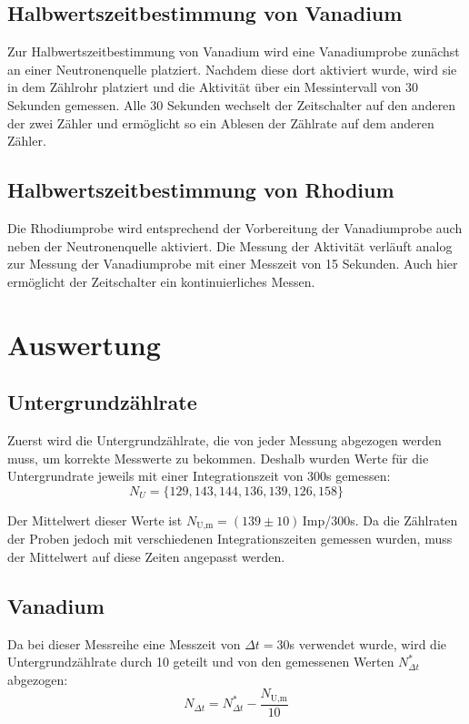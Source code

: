 \documentclass[titlepage = firstcover]{scrartcl}
\begin{document}
        \subsection{Halbwertszeitbestimmung von Vanadium}
            Zur Halbwertszeitbestimmung von Vanadium wird eine Vanadiumprobe zunächst an einer Neutronenquelle platziert. Nachdem diese dort aktiviert wurde, wird sie in dem Zählrohr platziert und 
            die Aktivität über ein Messintervall von 30 Sekunden gemessen. Alle 30 Sekunden wechselt der Zeitschalter auf den anderen der zwei Zähler und ermöglicht so ein Ablesen der Zählrate auf
            dem anderen Zähler.

        \subsection{Halbwertszeitbestimmung von Rhodium}
            Die Rhodiumprobe wird entsprechend der Vorbereitung der Vanadiumprobe auch neben der Neutronenquelle aktiviert. Die Messung der Aktivität verläuft analog zur Messung der Vanadiumprobe
            mit einer Messzeit von 15 Sekunden. Auch hier ermöglicht der Zeitschalter ein kontinuierliches Messen.
            
    \section{Auswertung}
        \subsection{Untergrundzählrate}
            Zuerst wird die Untergrundzählrate, die von jeder Messung abgezogen werden muss, um korrekte Messwerte zu bekommen.
            Deshalb wurden Werte für die Untergrundrate jeweils mit einer Integrationszeit von 300s gemessen:
            \begin{equation*}
                N_U = \{129, 143, 144, 136, 139, 126, 158\}
            \end{equation*}

            Der Mittelwert dieser Werte ist $N_{\text{U,m}} = (139 \pm 10)\,$Imp/300s. Da die Zählraten der Proben jedoch mit verschiedenen Integrationszeiten gemessen wurden, muss der Mittelwert auf diese Zeiten angepasst werden.

        \subsection{Vanadium}
            Da bei dieser Messreihe eine Messzeit von $\Delta t = 30$s verwendet wurde, wird die Untergrundzählrate durch 10 geteilt und von den gemessenen Werten $N^*_{\Delta t}$ abgezogen:
            \begin{equation*}
                N_{\Delta t} = N^*_{\Delta t} - \frac{N_{\text{U,m}}}{10}
            \end{equation*}
            
\end{document}
